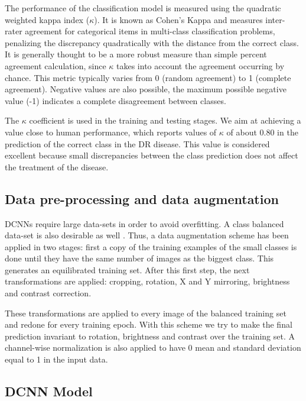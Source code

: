 \documentclass{IOS-Book-Article}
\begin{document}
The performance of the classification model is measured using the quadratic weighted kappa index ($\kappa$). It is known as Cohen's Kappa and measures inter-rater agreement for categorical items in multi-class classification problems\cite{kappa}, penalizing the discrepancy quadratically with the distance from the correct class. It is generally thought to be a more robust measure than simple percent agreement calculation, since $\kappa$ takes into account the agreement occurring by chance. This metric typically varies from 0 (random agreement) to 1 (complete agreement). Negative values are also possible, the maximum possible negative value (-1) indicates a complete disagreement between classes. 

The $\kappa$ coefficient is used in the training and testing stages. 
We aim at achieving a value close to human performance, which reports values of $\kappa$ of about 0.80 in the prediction of the correct class in the DR disease. This value is considered excellent because small discrepancies between the class prediction does not affect the treatment of the disease. 

\subsection{Data pre-processing and data augmentation}

DCNNs require large data-sets in order to avoid overfitting. A class balanced data-set is also desirable as well \cite{class-imbalance}. Thus, a data augmentation \cite{Krizhevsky:2012} scheme has been applied in two stages: first a copy of the training examples of the small classes is done until they have the same number of images as the biggest class. This generates an equilibrated training set. After this first step, the next transformations are applied: cropping, rotation, X and Y mirroring, brightness and contrast correction. 

These transformations are applied to every image of the balanced training set and redone for every training epoch. With this scheme we try to make the final prediction invariant to rotation, brightness and contrast over the training set. A channel-wise normalization is also applied to have 0 mean and standard deviation equal to 1 in the input data.

\subsection {DCNN Model}
\end{document}

